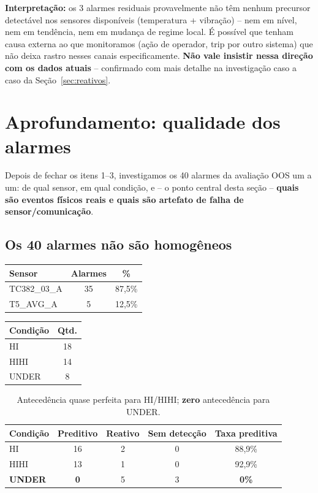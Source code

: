 \documentclass[11pt,a4paper]{article}
\begin{document}
\textbf{Interpretação:} os 3 alarmes residuais provavelmente não têm
nenhum precursor detectável nos sensores disponíveis (temperatura +
vibração) -- nem em nível, nem em tendência, nem em mudança de regime
local. É possível que tenham causa externa ao que monitoramos (ação de
operador, trip por outro sistema) que não deixa rastro nesses canais
especificamente. \textbf{Não vale insistir nessa direção com os dados
atuais} -- confirmado com mais detalhe na investigação caso a caso da
Seção~\ref{sec:reativos}.

\section{Aprofundamento: qualidade dos alarmes}
\label{sec:qualidade}

Depois de fechar os itens 1--3, investigamos os 40 alarmes da avaliação
OOS um a um: de qual sensor, em qual condição, e -- o ponto central desta
seção -- \textbf{quais são eventos físicos reais e quais são artefato de
falha de sensor/comunicação}.

\subsection{Os 40 alarmes não são homogêneos}

\begin{table}[H]
\centering
\begin{tabular}{@{}lcc@{}}
\toprule
\textbf{Sensor} & \textbf{Alarmes} & \textbf{\%} \\
\midrule
TC382\_03\_A & 35 & 87,5\% \\
T5\_AVG\_A & 5 & 12,5\% \\
\bottomrule
\end{tabular}
\qquad
\begin{tabular}{@{}lc@{}}
\toprule
\textbf{Condição} & \textbf{Qtd.} \\
\midrule
HI & 18 \\
HIHI & 14 \\
UNDER & 8 \\
\bottomrule
\end{tabular}
\end{table}

\begin{table}[H]
\centering
\begin{tabular}{@{}lcccc@{}}
\toprule
\textbf{Condição} & \textbf{Preditivo} & \textbf{Reativo} & \textbf{Sem detecção} & \textbf{Taxa preditiva} \\
\midrule
HI & 16 & 2 & 0 & 88,9\% \\
HIHI & 13 & 1 & 0 & 92,9\% \\
\textbf{UNDER} & \textbf{0} & 5 & 3 & \textbf{0\%} \\
\bottomrule
\end{tabular}
\caption{Antecedência quase perfeita para HI/HIHI; \textbf{zero}
antecedência para UNDER.}
\end{table}
\end{document}
